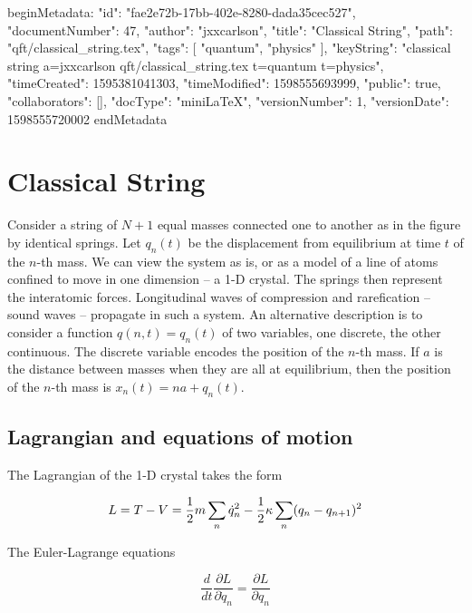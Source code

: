 beginMetadata:
{
    "id": "fae2e72b-17bb-402e-8280-dada35cec527",
    "documentNumber": 47,
    "author": "jxxcarlson",
    "title": "Classical String",
    "path": "qft/classical_string.tex",
    "tags": [
        "quantum",
        "physics"
    ],
    "keyString": "classical string a=jxxcarlson qft/classical_string.tex t=quantum t=physics",
    "timeCreated": 1595381041303,
    "timeModified": 1598555693999,
    "public": true,
    "collaborators": [],
    "docType": "miniLaTeX",
    "versionNumber": 1,
    "versionDate": 1598555720002
}
endMetadata
\setcounter{section}{15}

\section{Classical String}

\innertableofcontents

Consider a string of $N+1$ equal masses connected one to another as in the figure by identical springs.  Let $q_n(t)$ be the displacement from equilibrium at time $t$ of the $n$-th mass.  We can view the system as is, or as a model of a line of atoms confined to move in one dimension -- a 1-D crystal.  The springs then represent the interatomic forces.  Longitudinal waves of compression and rarefication -- sound waves -- propagate in such a system.  An alternative description is to consider a function $q(n,t) = q_n(t)$ of two variables, one discrete, the other continuous.  The discrete variable encodes the position of the $n$-th mass.  If $a$ is the distance between masses when they are all at equilibrium, then the position of the $n$-th mass is $x_n(t) = na + q_n(t)$. 
  




\subsection{ Lagrangian and equations of motion}

The Lagrangian of the 1-D crystal takes the form

\begin{equation}
L = T - V = \small{\frac{1}{2}} m \sum_n \dot q_n^2 - \small{\frac{1}{2}} \kappa \sum_n (q_n - q_{n+1})^2
\end{equation}

The Euler-Lagrange equations

\begin{equation}
\frac{d}{dt} \frac{\partial L}{\partial \dot q_n}
=  \frac{\partial L}{\partial q_n}
\end{equation}


